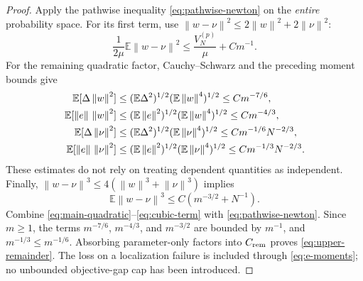 \documentclass[11pt,a4paper]{article}
\newcommand{\E}{\mathbb E}
\newcommand{\norm}[1]{\left\lVert#1\right\rVert}
\theoremstyle{definition}
\theoremstyle{remark}
\begin{document}
\begin{proof}
Apply the pathwise inequality \eqref{eq:pathwise-newton} on the \emph{entire} probability space.
For its first term, use $\norm{w-\nu}^2\le2\norm w^2+2\norm\nu^2$:
\begin{equation}\label{eq:main-quadratic}
 \frac1{2\mu}\E\norm{w-\nu}^2
 \le \frac{V_N^{(p)}}\mu+C m^{-1}.
\end{equation}
For the remaining quadratic factor, Cauchy--Schwarz and the preceding moment bounds give
\begin{align}
 \E[\Delta\norm w^2]
 &\le(\E\Delta^2)^{1/2}(\E\norm w^4)^{1/2}
 \le C m^{-7/6},\notag\\
 \E[\norm e\,\norm w^2]
 &\le(\E\norm e^2)^{1/2}(\E\norm w^4)^{1/2}
 \le C m^{-4/3},\notag\\
 \E[\Delta\norm\nu^2]
 &\le(\E\Delta^2)^{1/2}(\E\norm\nu^4)^{1/2}
 \le C m^{-1/6}N^{-2/3},\notag\\
 \E[\norm e\,\norm\nu^2]
 &\le(\E\norm e^2)^{1/2}(\E\norm\nu^4)^{1/2}
 \le C m^{-1/3}N^{-2/3}.
 \label{eq:weighted-terms}
\end{align}
These estimates do not rely on treating dependent quantities as independent.
Finally, $\norm{w-\nu}^3\le4(\norm w^3+\norm\nu^3)$ implies
\begin{equation}\label{eq:cubic-term}
 \E\norm{w-\nu}^3\le C(m^{-3/2}+N^{-1}).
\end{equation}
Combine \eqref{eq:main-quadratic}--\eqref{eq:cubic-term} with \eqref{eq:pathwise-newton}. Since $m\ge1$, the terms $m^{-7/6}$, $m^{-4/3}$, and $m^{-3/2}$ are bounded by $m^{-1}$, and $m^{-1/3}\le m^{-1/6}$. Absorbing parameter-only factors into $C_{\rm rem}$ proves \eqref{eq:upper-remainder}.
The loss on a localization failure is included through \eqref{eq:e-moments}; no unbounded objective-gap cap has been introduced.
\end{proof}
\end{document}
